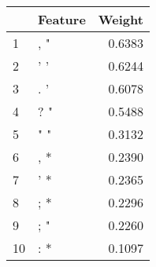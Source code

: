 \begin{tabular}{llr}
\toprule
{} & Feature &  Weight \\
\midrule
1  &     , " &  0.6383 \\
2  &     ' ' &  0.6244 \\
3  &     . ' &  0.6078 \\
4  &     ? " &  0.5488 \\
5  &     " " &  0.3132 \\
6  &     , * &  0.2390 \\
7  &     ' * &  0.2365 \\
8  &     ; * &  0.2296 \\
9  &     ; " &  0.2260 \\
10 &     : * &  0.1097 \\
\bottomrule
\end{tabular}
